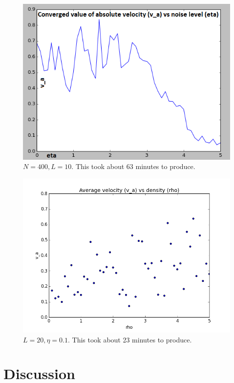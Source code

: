 \documentclass{article}
\begin{document}
\begin{figure}[ht]
  \centering \includegraphics[width=\textwidth]{2015-12-16_summary_eta.png}
  \caption{\label{fig:summary_eta} $N = 400, L = 10$.  This took about 63
    minutes to produce.}
\end{figure}

\begin{figure}[ht]
  \centering \includegraphics[width=\textwidth]{2015-12-16_summary_rho.png}
  \caption{\label{fig:summary_rho} $L = 20, \eta = 0.1$.  This took about 23
    minutes to produce.}
\end{figure}


\section{Discussion} %
\end{document}
